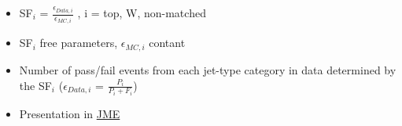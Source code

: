{\begin{columns}[T]
\begin{column}{0.5\textwidth}
        \begin{itemize}
          \small
        \item SF$_{i}$ = $\frac{\epsilon_{Data,i}}{\epsilon_{MC,i}}$ ,
          i = top, W, non-matched
        \item SF$_{i}$ free parameters, $\epsilon_{MC,i}$ contant
        \item Number of pass/fail events from each jet-type category in data determined by the SF$_{i}$ ($\epsilon_{Data,i}$ = $\frac{P_{i}}{P_{i}+F_{i}}$)
          \vspace{0.5cm}
        \item Presentation in \href{https://indico.cern.ch/event/1221195/contributions/5141581/attachments/2556595/4405807/Top_W_Calibration_Talk.pdf}{\textcolor{kBlue}{JME}}
        \end{itemize}
      \end{column}
    \end{columns}
    
}


